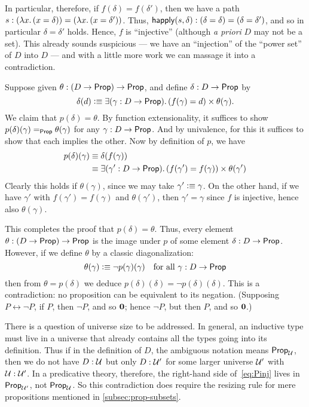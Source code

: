 In particular, therefore, if $f(\delta)=f(\delta')$, then we have a path $s:(\lam x(x=\delta)) = (\lam x(x=\delta'))$.
Thus, $\mathsf{happly}(s,\delta) : (\delta=\delta) = (\delta=\delta')$, and so in particular $\delta=\delta'$ holds.
Hence, $f$ is ``injective'' (although \emph{a priori} $D$ may not be a set).
This already sounds suspicious --- we have an ``injection'' of the ``power set'' of $D$ into $D$ --- and with a little more work we can massage it into a contradiction.

Suppose given $\theta:(D\to\mathsf{Prop})\to\mathsf{Prop}$, and define $\delta:D\to\mathsf{Prop}$ by
\begin{equation}
  \delta(d) \defeq \exis{\gamma:D\to\prop} (f(\gamma) = d) \times \theta(\gamma).\label{eq:Pinj}
\end{equation}
We claim that $p(\delta)=\theta$.
By function extensionality, it suffices to show $p(\delta)(\gamma) =_\mathsf{Prop} \theta(\gamma)$ for any $\gamma:D\to\mathsf{Prop}$.
And by univalence, for this it suffices to show that each implies the other.
Now by definition of $p$, we have
\begin{align*}
  p(\delta)(\gamma) &\jdeq \delta(f(\gamma))\\
  &\jdeq \exis{\gamma':D\to\prop} (f(\gamma') = f(\gamma)) \times \theta(\gamma')
\end{align*}
Clearly this holds if $\theta(\gamma)$, since we may take $\gamma'\vcentcolon\equiv \gamma$.
On the other hand, if we have $\gamma'$ with $f(\gamma') = f(\gamma)$ and $\theta(\gamma')$, then $\gamma'=\gamma$ since $f$ is injective, hence also $\theta(\gamma)$.

This completes the proof that $p(\delta)=\theta$.
Thus, every element $\theta:(D\to\mathsf{Prop})\to\mathsf{Prop}$ is the image under $p$ of some element $\delta:D\to\mathsf{Prop}$.
However, if we define $\theta$ by a classic diagonalization:
\[ \theta(\gamma) \vcentcolon\equiv \neg p(\gamma)(\gamma) \quad\text{for all $\gamma:D\to\mathsf{Prop}$} \]
then from $\theta = p(\delta)$ we deduce $p(\delta)(\delta) = \neg p(\delta)(\delta)$.
This is a contradiction: no proposition can be equivalent to its negation.
(Supposing $P\leftrightarrow \neg P$, if $P$, then $\neg P$, and so $\mathbf{0}$; hence $\neg P$, but then $P$, and so $\mathbf{0}$.)

\begin{rmk}
  There is a question of universe size to be addressed.
  In general, an inductive type must live in a universe that already contains all the types going into its definition.
  Thus if in the definition of $D$, the ambiguous notation \prop means $\mathsf{Prop}_{\mathcal{U}}$, then we do not have $D:\mathcal{U}$ but only $D:\mathcal{U}'$ for some larger universe $\mathcal{U}'$ with $\mathcal{U}:\mathcal{U}'$.
  In a predicative theory, therefore, the right-hand side of~\eqref{eq:Pinj} lives in $\mathsf{Prop}_{\mathcal{U}'}$, not $\mathsf{Prop}_\mathcal{U}$.
  So this contradiction does require the resizing rule for mere propositions mentioned in \autoref{subsec:prop-subsets}.
\end{rmk}

